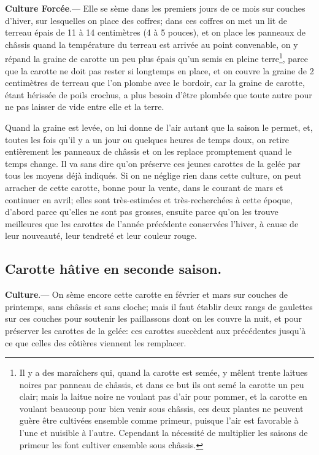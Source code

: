 \documentclass[10pt,a4paper]{book}
\begin{document}
\textbf{Culture Forcée}.--- Elle se sème dans les premiers jours de ce mois sur couches d'hiver, sur lesquelles on place des coffres; dans ces coffres on met un lit de terreau épais de 11 à 14 centimètres (4 à 5 pouces), et on place les panneaux de châssis quand la température du terreau est arrivée au point convenable, on y répand la graine de carotte un peu plus épais qu'un semis en pleine terre\footnote{Il y a des maraîchers qui, quand la carotte est semée, y mêlent trente laitues noires par panneau de châssis, et dans ce but ils ont semé la carotte un peu clair; mais la laitue noire ne voulant pas d'air pour pommer, et la carotte en voulant beaucoup pour bien venir sous châssis, ces deux plantes ne peuvent guère être cultivées ensemble comme primeur, puisque l'air est favorable à l'une et nuisible à l'autre. Cependant la nécessité de multiplier les saisons de primeur les font cultiver ensemble sous châssis.}, parce que la carotte ne doit pas rester si longtemps en place, et on couvre la graine de 2 centimètres de terreau que l'on plombe avec le bordoir, car la graine de carotte, étant hérissée de poils crochus, a plus besoin d'être plombée que toute autre pour ne pas laisser de vide entre elle et la terre.

Quand la graine est levée, on lui donne de l'air autant que la saison le permet, et, toutes les fois qu'il y a un jour ou quelques heures de temps doux, on retire entièrement les panneaux de châssis et on les replace promptement quand le temps change. Il va sans dire qu'on préserve ces jeunes carottes de la gelée par tous les moyens déjà indiqués. Si on ne néglige rien dans cette culture, on peut arracher de cette carotte, bonne pour la vente, dans le courant de mars et continuer en avril; elles sont très-estimées et très-recherchées à cette époque, d'abord parce qu'elles ne sont pas grosses, ensuite parce qu'on les trouve meilleures que les carottes de l'année précédente conservées l'hiver, à cause de leur nouveauté, leur tendreté et leur couleur rouge.

\subsection{Carotte hâtive en seconde saison.}

\textbf{Culture}.--- On sème encore cette carotte en février et mars sur couches de printemps, sans châssis et sans cloche; mais il faut établir deux rangs de gaulettes sur ces couches pour soutenir les paillassons dont on les couvre la nuit, et pour préserver les carottes de la gelée: ces carottes succèdent aux précédentes jusqu'à ce que celles des côtières viennent les remplacer.
\end{document}
